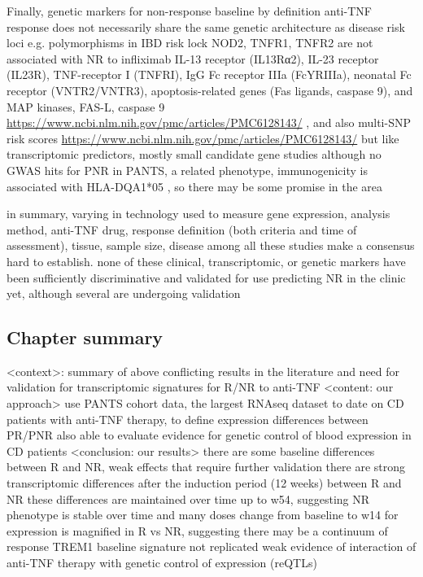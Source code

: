 \begin{outline}
\1 Finally, genetic markers for non-response \autocite{flamant2018InflammatoryBowelDisease}
    \2 baseline by definition
    \2 anti-TNF response does not necessarily share the same genetic architecture as disease risk loci e.g. polymorphisms in IBD risk lock NOD2, TNFR1, TNFR2 are not associated with NR to infliximab \autocite{digby-bell2019InterrogatingHostImmunity,noor2020PersonalisedMedicineCrohn}
    \2 IL-13 receptor (IL13Rα2), IL-23 receptor (IL23R), TNF-receptor I (TNFRI), IgG Fc receptor IIIa (FcYRIIIa), neonatal Fc receptor (VNTR2/VNTR3), apoptosis-related genes (Fas ligands, caspase 9), and MAP kinases, FAS-L, caspase 9 \url{https://www.ncbi.nlm.nih.gov/pmc/articles/PMC6128143/} \autocite{flamant2018InflammatoryBowelDisease}, and also multi-SNP risk scores \url{https://www.ncbi.nlm.nih.gov/pmc/articles/PMC6128143/}
    \2 but like transcriptomic predictors, mostly small candidate gene studies
    \2 although no GWAS hits for PNR in PANTS, a related phenotype, immunogenicity is associated with HLA-DQA1*05 \autocite{sazonovs2019HLADQA105Carriage}, so there may be some promise in the area

\1 in summary, varying in technology used to measure gene expression, analysis method, anti-TNF drug, response definition (both criteria and time of assessment), tissue, sample size, disease among all these studies make a consensus hard to establish.
    \2 none of these clinical, transcriptomic, or genetic markers have been sufficiently discriminative and validated for use predicting NR in the clinic yet, although several are undergoing validation \autocite{noor2020PersonalisedMedicineCrohn}

\subsection{Chapter summary}

\1 <context>: summary of above
    \2 conflicting results in the literature and need for validation for transcriptomic signatures for R/NR to anti-TNF 
\1 <content: our approach> 
    \2 use PANTS cohort data, the largest RNAseq dataset to date on CD patients with anti-TNF therapy, to define expression differences between PR/PNR
    \2 also able to evaluate evidence for genetic control of blood expression in CD patients
\1 <conclusion: our results> 
    \2 there are some baseline differences between R and NR, weak effects that require further validation
    \2 there are strong transcriptomic differences after the induction period (12 weeks) between R and NR
    \2 these differences are maintained over time up to w54, suggesting NR phenotype is stable over time and many doses
    \2 change from baseline to w14 for expression is magnified in R vs NR, suggesting there may be a continuum of response
    \2 TREM1 baseline signature not replicated
    \2 weak evidence of interaction of anti-TNF therapy with genetic control of expression (reQTLs)


\end{outline}
